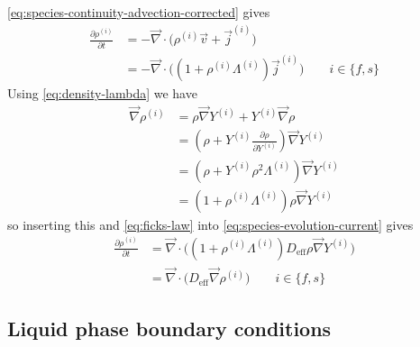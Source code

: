 \documentclass[12pt,twoside]{report}
\begin{document}
\eqref{eq:species-continuity-advection-corrected} gives
\begin{equation}\label{eq:species-evolution-current}
  \begin{aligned}
    \frac{\partial \rho^{(i)}}{\partial t} &=
    - \vec{\nabla} \cdot \Big(
    \rho^{(i)} \vec{v} + \vec{j}^{(i)}
    \Big)
    \\
    &=
    - \vec{\nabla} \cdot \Big(
    (1 + \rho^{(i)} \Lambda^{(i)}) \vec{j}^{(i)}
    \Big)
    \qquad i \in \{f,s\}
  \end{aligned}
\end{equation}
Using \eqref{eq:density-lambda} we have
\begin{equation*}
  \begin{aligned}
    \vec{\nabla} \rho^{(i)} &=
    \rho \vec{\nabla} Y^{(i)} +
    Y^{(i)} \vec{\nabla} \rho \\
    &=
    \left(
    \rho + Y^{(i)} \frac{\partial \rho}{\partial Y^{(i)}}
    \right)
    \vec{\nabla} Y^{(i)}
    \\
    &=
    \left(
    \rho +
    Y^{(i)} \rho^2 \Lambda^{(i)}
    \right)
    \vec{\nabla} Y^{(i)} \\
    &=
    \left(
    1 +
    \rho^{(i)} \Lambda^{(i)}
    \right)
    \rho
    \vec{\nabla} Y^{(i)}
  \end{aligned}
\end{equation*}
so inserting this and \eqref{eq:ficks-law} into \eqref{eq:species-evolution-current} gives
\begin{equation}\label{eq:species-evolution-final}
  \begin{aligned}
    \frac{\partial \rho^{(i)}}{\partial t} &=
    \vec{\nabla} \cdot \Big(
    (1 + \rho^{(i)} \Lambda^{(i)})
    D_{\textrm{eff}} \rho \vec{\nabla} Y^{(i)}
    \Big) \\
    &=
    \vec{\nabla} \cdot \Big(
    D_{\textrm{eff}} \vec{\nabla} \rho^{(i)}
    \Big)
    \qquad i \in \{f,s\}
  \end{aligned}
\end{equation}

\subsection{Liquid phase boundary conditions}
\end{document}
